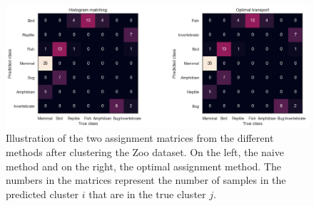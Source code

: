 \begin{figure}[H]
    \centering
    \includegraphics[width=\textwidth]{Attachments/assignment_method.png}
    \caption{Illustration of the two assignment matrices from the different methods after clustering the Zoo dataset. On the left, the naive method and on the right, the optimal assignment method.
    The numbers in the matrices represent the number of samples in the predicted cluster $i$ that are in the true cluster $j$.}
    \label{fig:assignment_methods}
\end{figure}

